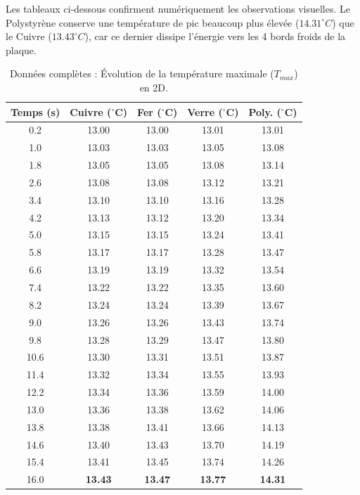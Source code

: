 \documentclass[a4paper,12pt]{article}
\begin{document}
Les tableaux ci-dessous confirment numériquement les observations visuelles. Le Polystyrène conserve une température de pic beaucoup plus élevée ($14.31^\circ C$) que le Cuivre ($13.43^\circ C$), car ce dernier dissipe l'énergie vers les 4 bords froids de la plaque.

\begin{table}[H]
    \centering
    \scriptsize
    \begin{tabular}{|c||c|c|c|c|}
        \hline
        \textbf{Temps (s)} & \textbf{Cuivre ($^\circ$C)} & \textbf{Fer ($^\circ$C)} & \textbf{Verre ($^\circ$C)} & \textbf{Poly. ($^\circ$C)} \\
        \hline \hline
        0.2  & 13.00 & 13.00 & 13.01 & 13.01 \\
        1.0  & 13.03 & 13.03 & 13.05 & 13.08 \\
        1.8  & 13.05 & 13.05 & 13.08 & 13.14 \\
        2.6  & 13.08 & 13.08 & 13.12 & 13.21 \\
        3.4  & 13.10 & 13.10 & 13.16 & 13.28 \\
        4.2  & 13.13 & 13.12 & 13.20 & 13.34 \\
        5.0  & 13.15 & 13.15 & 13.24 & 13.41 \\
        5.8  & 13.17 & 13.17 & 13.28 & 13.47 \\
        6.6  & 13.19 & 13.19 & 13.32 & 13.54 \\
        7.4  & 13.22 & 13.22 & 13.35 & 13.60 \\
        8.2  & 13.24 & 13.24 & 13.39 & 13.67 \\
        9.0  & 13.26 & 13.26 & 13.43 & 13.74 \\
        9.8  & 13.28 & 13.29 & 13.47 & 13.80 \\
        10.6 & 13.30 & 13.31 & 13.51 & 13.87 \\
        11.4 & 13.32 & 13.34 & 13.55 & 13.93 \\
        12.2 & 13.34 & 13.36 & 13.59 & 14.00 \\
        13.0 & 13.36 & 13.38 & 13.62 & 14.06 \\
        13.8 & 13.38 & 13.41 & 13.66 & 14.13 \\
        14.6 & 13.40 & 13.43 & 13.70 & 14.19 \\
        15.4 & 13.41 & 13.45 & 13.74 & 14.26 \\
        16.0 & \textbf{13.43} & \textbf{13.47} & \textbf{13.77} & \textbf{14.31} \\
        \hline
    \end{tabular}
    \caption{Données complètes : Évolution de la température maximale ($T_{max}$) en 2D.}
    \label{tab:tmax_2d_full}
\end{table}
\end{document}
